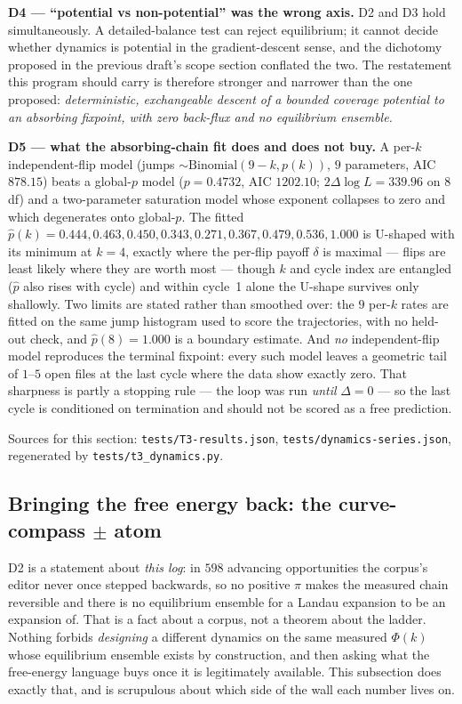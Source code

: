 \documentclass[11pt,a4paper]{article}
\theoremstyle{plain}
\theoremstyle{remark}
\theoremstyle{plain}
\begin{document}
\textbf{D4 --- ``potential vs non-potential'' was the wrong axis.} D2 and D3 hold
simultaneously. A detailed-balance test can reject equilibrium; it cannot decide
whether dynamics is potential in the gradient-descent sense, and the dichotomy
proposed in the previous draft's scope section conflated the two. The restatement
this program should carry is therefore stronger and narrower than the one proposed:
\emph{deterministic, exchangeable descent of a bounded coverage potential to an
absorbing fixpoint, with zero back-flux and no equilibrium ensemble.}

\textbf{D5 --- what the absorbing-chain fit does and does not buy.} A per-$k$
independent-flip model (jumps $\sim\mathrm{Binomial}(9-k,p(k))$, $9$ parameters,
AIC $878.15$) beats a global-$p$ model ($p=0.4732$, AIC $1202.10$;
$2\Delta\log L=339.96$ on $8$ df) and a two-parameter saturation model whose
exponent collapses to zero and which degenerates onto global-$p$. The fitted
$\hat p(k)=0.444,0.463,0.450,0.343,0.271,0.367,0.479,0.536,1.000$ is U-shaped with
its minimum at $k=4$, exactly where the per-flip payoff $\delta$ is maximal ---
flips are least likely where they are worth most --- though $k$ and cycle index are
entangled ($\hat p$ also rises with cycle) and within cycle~1 alone the U-shape
survives only shallowly. Two limits are stated rather than smoothed over: the
$9$ per-$k$ rates are fitted on the same jump histogram used to score the
trajectories, with no held-out check, and $\hat p(8)=1.000$ is a boundary estimate.
And \emph{no} independent-flip model reproduces the terminal fixpoint: every such
model leaves a geometric tail of $1$--$5$ open files at the last cycle where the
data show exactly zero. That sharpness is partly a stopping rule --- the loop was
run \emph{until} $\Delta=0$ --- so the last cycle is conditioned on termination and
should not be scored as a free prediction.

Sources for this section: \texttt{tests/T3-results.json},
\texttt{tests/dynamics-series.json}, regenerated by \texttt{tests/t3\_dynamics.py}.

\subsection{Bringing the free energy back: the curve-compass $\pm$ atom}
\label{sec:compass}

D2 is a statement about \emph{this log}: in $598$ advancing opportunities the
corpus's editor never once stepped backwards, so no positive $\pi$ makes the
measured chain reversible and there is no equilibrium ensemble for a Landau
expansion to be an expansion of. That is a fact about a corpus, not a theorem
about the ladder. Nothing forbids \emph{designing} a different dynamics on the
same measured $\Phi(k)$ whose equilibrium ensemble exists by construction, and
then asking what the free-energy language buys once it is legitimately available.
This subsection does exactly that, and is scrupulous about which side of the wall
each number lives on.
\end{document}
